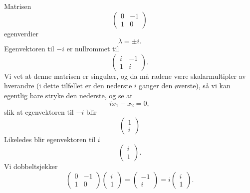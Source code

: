 \begin{ex}
Matrisen
\[
\begin{pmatrix}
0 & -1 \\ 1 &0
\end{pmatrix}
\]
egenverdier
\[
\lambda=\pm i.
\] 
Egenvektoren til $-i$ er nullrommet til 
\[
\begin{pmatrix}
i & -1 \\ 1 &i
\end{pmatrix}.
\]
Vi vet at denne matrisen er singulær, 
og da må radene være skalarmultipler av hverandre (i dette tilfellet er den nederste $i$ ganger den øverste), 
så vi kan egentlig bare stryke den nederste, og se at
\[
ix_1-x_2=0,
\]
slik at egenvektoren til $-i$ blir
\[
\begin{pmatrix}
1  \\ i
\end{pmatrix}
\]
Likeledes blir egenvektoren til $i$ 
\[
\begin{pmatrix}
i  \\ 1
\end{pmatrix}.
\]
Vi dobbeltsjekker
\[
\begin{pmatrix}
0 & -1 \\ 1 &0
\end{pmatrix}
\begin{pmatrix}
i  \\ 1
\end{pmatrix}
=
\begin{pmatrix}
-1  \\ i
\end{pmatrix}
=
i
\begin{pmatrix}
i  \\ 1
\end{pmatrix}.
\]

\end{ex}

